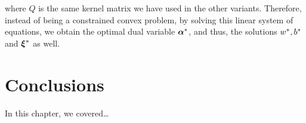 where $Q$ is the same kernel matrix we have used in the other variants.
Therefore, instead of being a constrained convex problem, by solving this linear system of equations, we obtain the optimal dual variable ${\bm{\alpha}}^*$, and thus, the solutions ${w}^*, {b}^*$ and ${\bm{\xi}}^*$ as well.

\section{Conclusions}\label{sec-conclusions-1}

In this chapter, we covered\dots
